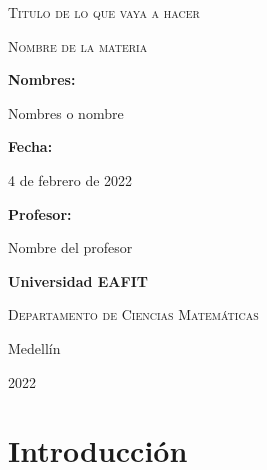 \documentclass[a4paper,12pt]{article}
\renewcommand\labelenumii{\theenumi.\arabic{enumii}.}
\renewcommand\labelenumiii{\theenumi.\alph{enumiii}.}
\begin{document}
\begin{titlepage}
\centering
{\scshape Titulo de lo que vaya a hacer \par}
{\scshape\huge Nombre de la materia \par}
\vspace{1.5cm}
{\bfseries\Large Nombres: \par}
\vspace{0.5cm}
{\Large  Nombres o nombre\par}

\vfill
{\bfseries\Large Fecha:}
{\Large 4 de febrero de 2022 \par}
\vfill
{\bfseries\Large Profesor:}
{\Large Nombre del profesor \par}
\vspace{3cm}
{\bfseries\LARGE Universidad EAFIT \par}
\vspace{0.5cm}
{\scshape\Large Departamento de Ciencias Matemáticas \par}
\vspace{0.5cm}
{\Large Medellín \par}
\vspace{0.5cm}
{\Large 2022 \par}
\end{titlepage}

\fancyfoot{}
\fancyfoot[R]{\thepage} 

\newenvironment{packed_enum}{%
  \renewcommand{\labelenumi}{\textbf{\arabic{enumi}}.}%
  \renewcommand{\labelenumii}{\alph{enumii}.}%
  \renewcommand{\labelenumiii}{\roman{enumiii}.}%
  \begin{enumerate}[itemsep=1pt,parsep=0pt,leftmargin=*]%
  }{\end{enumerate}}

\section{Introducción}
\end{document}
